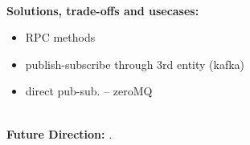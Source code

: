 \noindent \textbf{\\Solutions, trade-offs and usecases:}

\begin{itemize}
	\item RPC methods
	\item publish-subscribe through 3rd entity (kafka)
	\item direct pub-sub. -- zeroMQ
	
\end{itemize}



\noindent \textbf{\\Future Direction:}  
.




